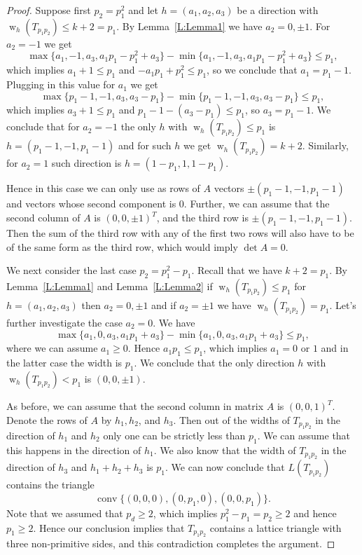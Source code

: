\documentclass[10pt,a4paper]{amsart}
\newcommand{\conv}{\operatorname{conv}}
\newcommand{\w}{\operatorname{w}}
\begin{document}
\begin{proof}
Suppose first $p_2=p_1^2$ and let $h=(a_1, a_2,a_3)$ be a direction with $\w_h(T_{p_1p_2})\leq k+2=p_1$.
By Lemma~\ref{L:Lemma1} we have $a_2=0,\pm 1$.  For  $a_2=-1$ we get
$$\max\{a_1,-1,a_3,a_1p_1-p_1^2+a_3\}-\min\{a_1,-1,a_3,a_1p_1-p_1^2+a_3\}\le p_1,
$$
which implies $a_1+1\leq p_1$ and $-a_1p_1+p_1^2\leq p_1$, so we conclude that $a_1=p_1-1$. Plugging in this value for $a_1$ we get
$$\max\{p_1-1,-1,a_3,a_3-p_1\}-\min\{p_1-1,-1,a_3,a_3-p_1\}\le p_1,
$$
which implies $a_3+1\leq p_1$ and $p_1-1-(a_3-p_1)\leq p_1$, so $a_3=p_1-1$. We conclude that for $a_2=-1$ the only $h$ with $\w_h(T_{p_1p_2})\leq p_1$ is 
$h=(p_1-1,-1,p_1-1)$ and for such $h$ we get $\w_h(T_{p_1p_2})=k+2$. Similarly, for $a_2=1$ such direction is $h=(1-p_1,1,1-p_1)$.



Hence  in this case we can only use as rows of $A$ vectors $\pm (p_1-1,-1,p_1-1)$ and vectors whose second component is 0.
Further, we can assume that the second column of $A$ is $(0,0,\pm 1)^T$, and the third row is $\pm (p_1-1,-1,p_1-1)$.
Then the sum of the third row with any of the first two rows will also have to be of the same form as the third row, which would imply $\det A=0$.

We next consider the last case $p_2=p_1^2-p_1$. Recall that we have $k+2=p_1$. By Lemma~\ref{L:Lemma1} and Lemma~\ref{L:Lemma2} if $\w_h(T_{p_1p_2})\leq p_1$ for 
$h=(a_1,a_2,a_3)$ then $a_2=0,\pm 1$ and if $a_2=\pm 1$ we have $\w_h(T_{p_1p_2})= p_1$. Let's further investigate the case $a_2=0$. We have 
$$\max\{a_1,0,a_3,a_1p_1+a_3\}-\min\{a_1,0,a_3,a_1p_1+a_3\}\le p_1,
$$
where we can assume $a_1\geq 0$. Hence $a_1p_1\leq p_1$, which implies $a_1=0$ or $1$ and in the latter case the width is $p_1$. We conclude that the only direction $h$ with $\w_h(T_{p_1p_2})< p_1$ is 
$(0,0,\pm 1)$.

As before, we can assume that the second column in matrix $A$ is $(0,0,1)^T$. Denote the rows of $A$ by $h_1,h_2$, and $h_3$.
Then out of the widths of $T_{p_1p_2}$ in the direction of  $h_1$ and $h_2$ only one can be strictly less than $p_1$.
We can assume that this happens in the direction of $h_1$. We also know that the width of $T_{p_1p_2}$ in the direction of $h_3$ and $h_1+h_2+h_3$
is $p_1$. We can now conclude that $L(T_{p_1p_2})$ contains the triangle 
$$\conv\{(0,0,0), (0,p_1,0), (0,0,p_1)\}.
$$
Note that we assumed that $p_d\geq 2$, which implies $p_1^2-p_1=p_2\geq 2$ and hence $p_1\geq 2$. Hence our conclusion implies  that  $T_{p_1p_2}$ contains a lattice triangle with three 
non-primitive sides, and this contradiction completes the argument.
\end{proof}
\end{document}
